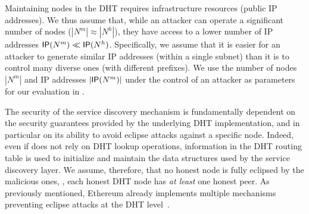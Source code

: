 Maintaining nodes in the DHT requires infrastructure resources (public IP addresses). We thus assume that, while an attacker can operate a significant number of nodes (\eg $|N^m|  \approx |N^h|$), they have access to a lower number of IP addresses $\mathsf{IP}(N^m)  \ll \mathsf{IP}(N^h)$.
Specifically, we assume that it is easier for an attacker to generate similar IP addresses (\ie within a single subnet) than it is to control many diverse ones (with different prefixes).
We use the number of nodes $|N^m|$ and IP addresses $|\mathsf{IP}(N^m)|$ under the control of an attacker as parameters for our evaluation in .


The security of the service discovery mechanism is fundamentally dependent on the security guarantees provided by the underlying DHT implementation, and in particular on its ability to avoid eclipse attacks against a specific node.
Indeed, even if \sysname does not rely on DHT lookup operations, information in the DHT routing table is used to initialize and maintain the data structures used by the service discovery layer.
We assume, therefore, that no honest node is fully eclipsed by the malicious ones, \ie, each honest DHT node has \emph{at least} one honest peer.
As previously mentioned, Ethereum already implements multiple mechanisms preventing eclipse attacks at the DHT level~\cite{marcus2018low, henningsen2019eclipsing}.  


